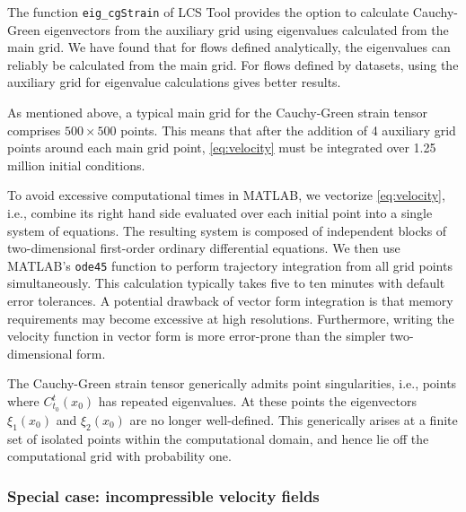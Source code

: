 \documentclass[5p]{elsarticle}
\begin{document}
\begin{sloppypar}
The function \lstinline!eig_cgStrain! of LCS Tool provides the option to calculate Cauchy-Green eigenvectors from the auxiliary grid using eigenvalues calculated from the main grid. We have found that for flows defined analytically, the eigenvalues can reliably be calculated from the main grid. For flows defined by datasets, using the auxiliary grid for eigenvalue calculations gives better results.
\end{sloppypar}

\begin{sloppypar}
As mentioned above, a typical main grid for the Cauchy-Green strain tensor comprises $500 \times 500$ points. This means that after the addition of 4 auxiliary grid points around each main grid point, \cref{eq:velocity} must be integrated over 1.25 million initial conditions.
\end{sloppypar}

To avoid excessive computational times in MATLAB, we vectorize \cref{eq:velocity}, i.e., combine its right hand side evaluated over each initial point into a single system of equations. The resulting system is composed of independent blocks of two-dimensional first-order ordinary differential equations. We then use MATLAB's \lstinline!ode45! function to perform trajectory integration from all grid points simultaneously. This calculation typically takes five to ten minutes with default error tolerances.
A potential drawback of vector form integration is that memory requirements may become excessive at high resolutions. Furthermore, writing the velocity function in vector form is more error-prone than the simpler two-dimensional form.

\begin{sloppypar}
The Cauchy-Green strain tensor generically admits point singularities, i.e., points where $C_{t_0}^t(x_0)$ has repeated eigenvalues. At these points the eigenvectors $\xi_1(x_0)$ and $\xi_2(x_0)$ are no longer well-defined. This generically arises at a finite set of isolated points within the computational domain\citep{delmarcelle94}, and hence lie off the computational grid with probability one.
\end{sloppypar}

\subsubsection{Special case: incompressible velocity fields}
\end{document}
